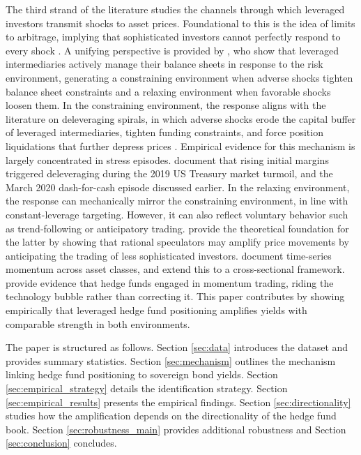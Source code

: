 \documentclass[english, 11pt, oneside]{article}
\begin{document}
The third strand of the literature studies the channels through which leveraged investors transmit shocks to asset prices. Foundational to this is the idea of limits to arbitrage, implying that sophisticated investors cannot perfectly respond to every shock \citep{shleifer1997, gromb2002}. A unifying perspective is provided by \citet{adrian2014}, who show that leveraged intermediaries actively manage their balance sheets in response to the risk environment, generating a constraining environment when adverse shocks tighten balance sheet constraints and a relaxing environment when favorable shocks loosen them. In the constraining environment, the response aligns with the literature on deleveraging spirals, in which adverse shocks erode the capital buffer of leveraged intermediaries, tighten funding constraints, and force position liquidations that further depress prices \citep{brunnermeier2009, geanakoplos2010, adrian2010}. Empirical evidence for this mechanism is largely concentrated in stress episodes. \citet{avalos2023} document that rising initial margins triggered deleveraging during the 2019 US Treasury market turmoil, and the March 2020 dash-for-cash episode discussed earlier. In the relaxing environment, the response can mechanically mirror the constraining environment, in line with constant-leverage targeting. However, it can also reflect voluntary behavior such as trend-following or anticipatory trading. \citet{deLong1990} provide the theoretical foundation for the latter by showing that rational speculators may amplify price movements by anticipating the trading of less sophisticated investors. \citet{moskowitz2012} document time-series momentum across asset classes, and \citet{asness2013} extend this to a cross-sectional framework. \citet{brunnermeier2004} provide evidence that hedge funds engaged in momentum trading, riding the technology bubble rather than correcting it. This paper contributes by showing empirically that leveraged hedge fund positioning amplifies yields with comparable strength in both environments.







\vspace{1em}\noindent
The paper is structured as follows. Section \ref{sec:data} introduces the dataset and provides summary statistics. Section \ref{sec:mechanism} outlines the mechanism linking hedge fund positioning to sovereign bond yields. Section \ref{sec:empirical_strategy} details the identification strategy. Section \ref{sec:empirical_results} presents the empirical findings. Section \ref{sec:directionality} studies how the amplification depends on the directionality of the hedge fund book. Section \ref{sec:robustness_main} provides additional robustness and Section \ref{sec:conclusion} concludes.
\end{document}
